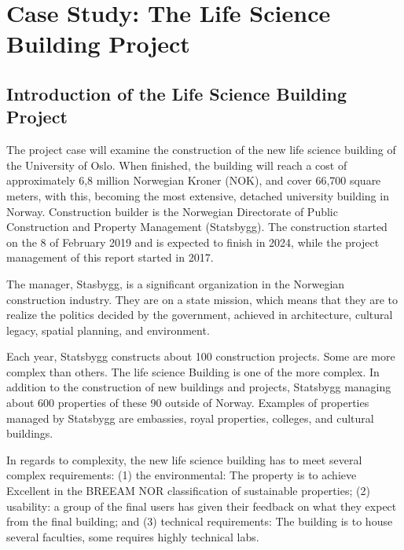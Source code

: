
\chapter{Case Study: The Life Science Building Project}
\section{Introduction of the Life Science Building Project}
The project case will examine the construction of the new life science building of the University of Oslo. When finished, the building will reach a cost of approximately 6,8 million Norwegian Kroner (NOK), and cover 66,700 square meters, with this, becoming the most extensive, detached university building in Norway. Construction builder is the Norwegian Directorate of Public Construction and Property Management (Statsbygg). The construction started on the 8 of February 2019 and is expected to finish in 2024, while the project management of this report started in 2017.

The manager, Stasbygg, is a significant organization in the Norwegian construction industry. They are on a state mission, which means that they are to realize the politics decided by the government, achieved in architecture, cultural legacy, spatial planning, and environment. 

Each year, Statsbygg constructs about 100 construction projects. Some are more complex than others. The life science Building is one of the more complex. In addition to the construction of new buildings and projects, Statsbygg managing about 600 properties of these 90 outside of Norway. Examples of properties managed by Statsbygg are embassies, royal properties, colleges, and cultural buildings. 

In regards to complexity, the new life science building has to meet several complex requirements: (1) the environmental: The property is to achieve Excellent in the BREEAM NOR classification of sustainable properties; (2) usability: a group of the final users has given their feedback on what they expect from the final building; and (3) technical requirements: The building is to house several faculties, some requires highly technical labs.

